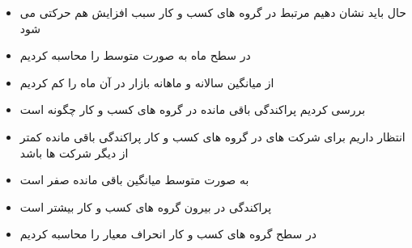 \begin{itemize}
\item
حال باید نشان دهیم 
مرتبط در گروه های کسب و کار سبب افزایش هم حرکتی می شود
\item
{}
در سطح ماه به صورت متوسط 
را محاسبه کردیم
\item
از 
میانگین سالانه
و 
ماهانه بازار  در آن ماه را کم کردیم
\item
بررسی کردیم پراکندگی باقی مانده در گروه های کسب و کار چگونه است
\item
انتظار داریم برای شرکت های در  گروه های کسب و کار پراکندگی باقی مانده کمتر از دیگر شرکت ها باشد
	\lr{\begin{LTR}
	\begin{table}[htbp]
		\centering
		\resizebox{0.8\textwidth}{!}{
			
		}
		\label{tab:ResidualTrunSummary}
	\end{table}	
	\end{LTR}}
	\item
		به صورت متوسط میانگین باقی مانده صفر است
			\item
			پراکندگی در بیرون گروه های کسب و کار بیشتر است
				\item
				در سطح گروه های کسب و کار انحراف معیار را محاسبه کردیم
				

\end{itemize}
